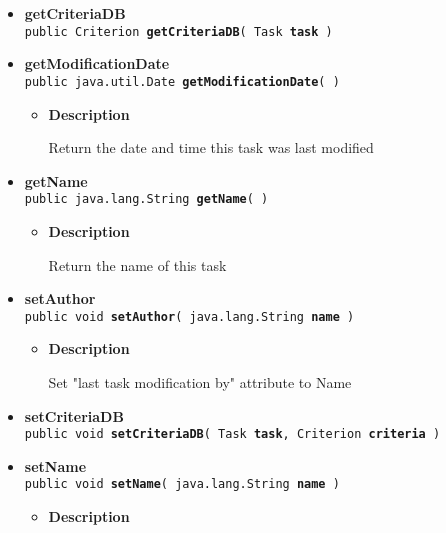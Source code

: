 {{{\begin{itemize}
{\begin{itemize}
{Return name of the last person who has modified this task
}
\end{itemize}
}%
 \item{ 
{\bf getCriteriaDB}\\
{\tt public Criterion\lbrack \rbrack \ {\bf getCriteriaDB}( {\tt Task} {\bf task} )
\label{fi.helsinki.cs.kohahdus.Task.getCriteriaDB(fi.helsinki.cs.kohahdus.Task)}}%
}%
 \item{ 
{\bf getModificationDate}\\
{\tt public java.util.Date\ {\bf getModificationDate}(  )
\label{fi.helsinki.cs.kohahdus.Task.getModificationDate()}}%
\begin{itemize}
\item{
{\bf Description}

Return the date and time this task was last modified
}
\end{itemize}
}%
 \item{ 
{\bf getName}\\
{\tt public java.lang.String\ {\bf getName}(  )
\label{fi.helsinki.cs.kohahdus.Task.getName()}}%
\begin{itemize}
\item{
{\bf Description}

Return the name of this task
}
\end{itemize}
}%
 \item{ 
{\bf setAuthor}\\
{\tt public void\ {\bf setAuthor}( {\tt java.lang.String} {\bf name} )
\label{fi.helsinki.cs.kohahdus.Task.setAuthor(java.lang.String)}}%
\begin{itemize}
\item{
{\bf Description}

Set "last task modification by" attribute to Name
}
\end{itemize}
}%
 \item{ 
{\bf setCriteriaDB}\\
{\tt public void\ {\bf setCriteriaDB}( {\tt Task} {\bf task},
{\tt Criterion\lbrack \rbrack } {\bf criteria} )
\label{fi.helsinki.cs.kohahdus.Task.setCriteriaDB(fi.helsinki.cs.kohahdus.Task, fi.helsinki.cs.kohahdus.Criterion[])}}%
}%
 \item{ 
{\bf setName}\\
{\tt public void\ {\bf setName}( {\tt java.lang.String} {\bf name} )
\label{fi.helsinki.cs.kohahdus.Task.setName(java.lang.String)}}%
\begin{itemize}
\item{
{\bf Description}

}
\end{itemize}}
\end{itemize}}}}
